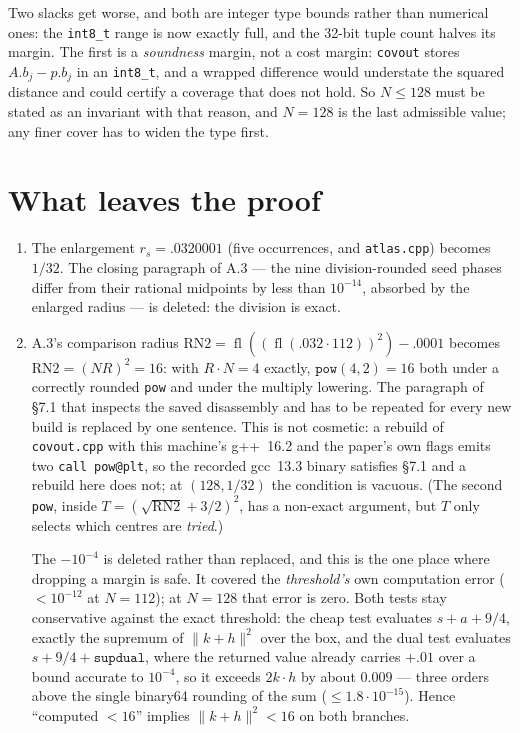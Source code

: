 \documentclass[11pt]{article}
\newcommand{\fl}{\operatorname{fl}}
\begin{document}
\noindent
Two slacks get worse, and both are integer type bounds rather than numerical ones: the
\texttt{int8\_t} range is now exactly full, and the 32-bit tuple count halves its margin. The first
is a \emph{soundness} margin, not a cost margin: \texttt{covout} stores $A.b_j-p.b_j$ in an
\texttt{int8\_t}, and a wrapped difference would understate the squared distance and could certify a
coverage that does not hold. So $N\le128$ must be stated as an invariant with that reason, and
$N=128$ is the last admissible value; any finer cover has to widen the type first.

\section{What leaves the proof}

\begin{enumerate}
\item The enlargement $r_s=.0320001$ (five occurrences, and \texttt{atlas.cpp}) becomes $1/32$. The
  closing paragraph of A.3 --- the nine division-rounded seed phases differ from their rational
  midpoints by less than $10^{-14}$, absorbed by the enlarged radius --- is deleted: the division
  is exact.
\item A.3's comparison radius $\mathrm{RN2}=\fl((\fl(.032\cdot112))^2)-.0001$ becomes
  $\mathrm{RN2}=(NR)^2=16$: with $R\cdot N=4$ exactly, $\texttt{pow}(4,2)=16$ both under a
  correctly rounded \texttt{pow} and under the multiply lowering. The paragraph of \S7.1 that
  inspects the saved disassembly and has to be repeated for every new build is replaced by one
  sentence. This is not cosmetic: a rebuild of \texttt{covout.cpp} with this machine's g++~16.2 and
  the paper's own flags emits two \texttt{call pow@plt}, so the recorded gcc~13.3 binary satisfies
  \S7.1 and a rebuild here does not; at $(128,1/32)$ the condition is vacuous. (The second
  \texttt{pow}, inside $T=(\sqrt{\mathrm{RN2}}+3/2)^2$, has a non-exact argument, but $T$ only
  selects which centres are \emph{tried}.)

  The $-10^{-4}$ is deleted rather than replaced, and this is the one place where dropping a margin
  is safe. It covered the \emph{threshold's} own computation error ($<10^{-12}$ at $N=112$); at
  $N=128$ that error is zero. Both tests stay conservative against the exact threshold: the cheap
  test evaluates $s+a+9/4$, exactly the supremum of $\|k+h\|^2$ over the box, and the dual test
  evaluates $s+9/4+\texttt{supdual}$, where the returned value already carries $+.01$ over a bound
  accurate to $10^{-4}$, so it exceeds $2k\cdot h$ by about $0.009$ --- three orders above the single
  binary64 rounding of the sum ($\le1.8\cdot10^{-15}$). Hence ``computed $<16$'' implies
  $\|k+h\|^2<16$ on both branches.


\end{enumerate}
\end{document}
